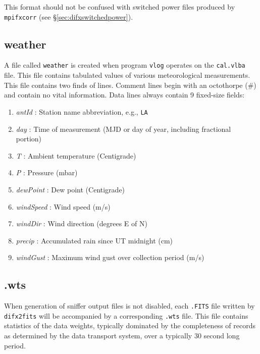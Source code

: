 This format should not be confused with switched power files produced by {\tt mpifxcorr} (see \S\ref{sec:difxswitchedpower}).







\subsection{weather} \label{sec:weather}

A file called {\tt weather} is created when program {\tt vlog} operates on the {\tt cal.vlba} file.
This file contains tabulated values of various meteorological measurements.
This file contains two finds of lines.
Comment lines begin with an octothorpe (\#) and contain no vital information.
Data lines always contain 9 fixed-size fields:
\begin{enumerate}
\item {\em antId} : Station name abbreviation, e.g., {\tt LA}
\item {\em day} : Time of measurement (MJD or day of year, including fractional portion)
\item {\em T} : Ambient temperature (Centigrade)
\item {\em P} : Pressure (mbar)
\item {\em dewPoint} : Dew point (Centigrade)
\item {\em windSpeed} : Wind speed (m/s)
\item {\em windDir} : Wind direction (degrees E of N)
\item {\em precip} : Accumulated rain since UT midnight (cm)
\item {\em windGust} : Maximum wind gust over collection period (m/s)
\end{enumerate}









\subsection{.wts} \label{sec:wts}

When generation of sniffer output files is not disabled, each {\tt .FITS} file written by {\tt difx2fits} will be accompanied by a corresponding {\tt .wts} file. 
This file contains statistics of the data weights, typically dominated by the completeness of records as determined by the data transport system, over a typically 30 second long period.

